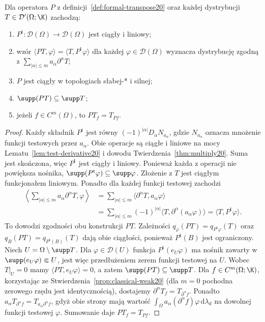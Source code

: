 \begin{twierdzenie}
\label{thm:transpose20}
Dla operatora $P$ z definicji~\ref{def:formal-transpose20}
oraz każdej dystrybucji $T\in\mathcal D'(\Omega;\K)$
zachodzą:
\begin{enumerate}
\item $P^{\mathrm t}:\mathcal D(\Omega)\to\mathcal D(\Omega)$
jest ciągły i liniowy;
\item wzór $\langle PT,\varphi\rangle=
\langle T,P^{\mathrm t}\varphi\rangle$ dla każdej
$\varphi\in\mathcal D(\Omega)$ wyznacza dystrybucję
zgodną z $\sum_{|\alpha|\le m}a_\alpha\partial^\alpha T$;
\item $P$ jest ciągły w topologiach słabej-* i silnej;
\item $\supp(PT)\subseteq\supp T$;
\item jeżeli $f\in C^m(\Omega)$, to $PT_f=T_{Pf}$.
\end{enumerate}
\end{twierdzenie}
\begin{proof}
Każdy składnik $P^{\mathrm t}$ jest równy
$(-1)^{|\alpha|}D_\alpha N_{a_\alpha}$, gdzie
$N_{a_\alpha}$ oznacza mnożenie funkcji testowych przez
$a_\alpha$. Obie operacje są ciągłe i liniowe na mocy
Lematu~\ref{lem:test-derivative20} i dowodu
Twierdzenia~\ref{thm:multiply20}. Suma jest skończona,
więc $P^{\mathrm t}$ jest ciągły i liniowy.
Ponieważ każda z operacji nie powiększa nośnika,
$\supp(P^{\mathrm t}\varphi)\subseteq\supp\varphi$.
Złożenie z $T$ jest ciągłym funkcjonałem liniowym.
Ponadto dla każdej funkcji testowej zachodzi
\[
\begin{aligned}
\left\langle\sum_{|\alpha|\le m}a_\alpha\partial^\alpha T,
\varphi\right\rangle
&=\sum_{|\alpha|\le m}\langle\partial^\alpha T,
a_\alpha\varphi\rangle\\
&=\sum_{|\alpha|\le m}(-1)^{|\alpha|}
\langle T,\partial^\alpha(a_\alpha\varphi)\rangle
=\langle T,P^{\mathrm t}\varphi\rangle.
\end{aligned}
\]
To dowodzi zgodności obu konstrukcji $PT$.
Zależności
$q_\varphi(PT)=q_{P^{\mathrm t}\varphi}(T)$ oraz
$q_B(PT)=q_{P^{\mathrm t}(B)}(T)$
dają obie ciągłości, ponieważ $P^{\mathrm t}(B)$ jest ograniczony.
Niech $U=\Omega\setminus\supp T$. Dla
$\varphi\in\mathcal D(U)$ funkcja $P^{\mathrm t}(e_U\varphi)$
ma nośnik zawarty w $\supp(e_U\varphi)\Subset U$,
jest więc przedłużeniem zerem funkcji testowej na $U$.
Wobec $T|_U=0$ mamy $\langle PT,e_U\varphi\rangle=0$,
a zatem $\supp(PT)\subseteq\supp T$.
Dla $f\in C^m(\Omega;\K)$, korzystając ze
Stwierdzenia~\ref{prop:classical-weak20} (dla $m=0$
pochodna zerowego rzędu jest identycznością), dostajemy
$\partial^\alpha T_f=T_{\partial^\alpha f}$.
Ponadto $a_\alpha T_{\partial^\alpha f}
=T_{a_\alpha\partial^\alpha f}$, gdyż obie strony mają
wartość $\int_\Omega a_\alpha(\partial^\alpha f)\varphi\,
\mathrm d\lambda_d$ na dowolnej funkcji testowej $\varphi$.
Sumowanie daje $PT_f=T_{Pf}$.
\end{proof}

